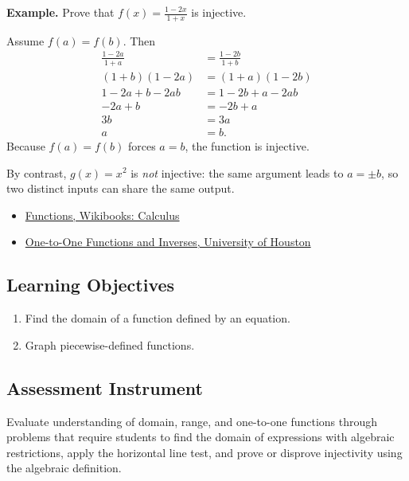 \textbf{Example.} Prove that $f(x) = \frac{1-2x}{1+x}$ is injective.

Assume $f(a) = f(b)$.  Then
\begin{align}
  \frac{1-2a}{1+a} &= \frac{1-2b}{1+b} \\
  (1+b)(1-2a) &= (1+a)(1-2b) \\
  1 - 2a + b - 2ab &= 1 - 2b + a - 2ab \\
  -2a + b &= -2b + a \\
  3b &= 3a \\
  a &= b.
\end{align}
Because $f(a) = f(b)$ forces $a = b$, the function is injective.

By contrast, $g(x) = x^{2}$ is \emph{not} injective: the same argument leads
to $a = \pm b$, so two distinct inputs can share the same output.

\begin{itemize}
  \item \href{https://en.wikibooks.org/wiki/Calculus/Functions}{Functions, Wikibooks: Calculus}
  \item \href{https://www.math.uh.edu/~jiwenhe/Math1432/lectures/lecture01_handout.pdf}{One-to-One Functions and Inverses, University of Houston}
\end{itemize}

\subsection{Learning Objectives}
\label{ssec:lear-fe6e}

\begin{enumerate}
    \item Find the domain of a function defined by an equation.
    \item Graph piecewise-defined functions.
\end{enumerate}

\subsection{Assessment Instrument}
\label{ssec:asse-3669}

Evaluate understanding of domain, range, and one-to-one functions through problems that
require students to find the domain of expressions with algebraic restrictions, apply the
horizontal line test, and prove or disprove injectivity using the algebraic definition.

